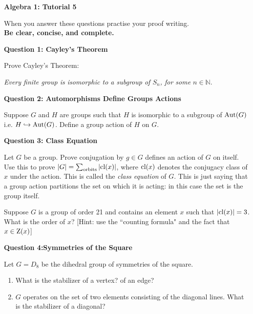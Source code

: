 \documentclass[11pt,twoside, a4paper]{report}
\theoremstyle{plain}
\theoremstyle{definition}
\newcommand{\cl}{\textnormal{cl}} %
\newcommand{\Z}{\textnormal{Z}} %
\newcommand{\injmor}{\hookrightarrow}%
\newcommand{\Aut}{\textnormal{Aut}}%
\begin{document}
\begin{center}
 \noindent\makebox[\linewidth]{\rule{14cm}{1.5pt}} 
{\bf Algebra 1: Tutorial 5 }
 \noindent\makebox[\linewidth]{\rule{14cm}{1.5pt}}  
 \noindent\makebox[\linewidth]{\rule{14cm}{3pt}}
\end{center}

\noindent When you answer these questions practise your proof writing.\\
  {\bf Be clear, concise, and complete.}
  
  
\begin{center}
{\bf Question 1: Cayley's Theorem}
\end{center}

Prove Cayley's Theorem: 

\begin{center} 
\emph{Every finite group is isomorphic to a subgroup of $S_{n}$, for some $n \in \mathbb{N}$}. 
\end{center}


\begin{center}
{\bf Question 2: Automorphisms Define Groups Actions}
\end{center}

Suppose $G$ and $H$ are groups such that $H$ is isomorphic to a subgroup of $\Aut(G)$ i.e. $H \injmor \Aut(G)$. Define a group action of $H$ on $G$. 

\begin{center}
{\bf Question 3: Class Equation}
\end{center}

Let $G$ be a group. Prove conjugation by $g \in G$ defines an action of $G$ on itself. Use this to prove $|G|=\sum_{\textnormal{orbits}}|\cl(x)|$, where $\cl(x)$ denotes the conjugacy class of $x$ under the action. This is called the \emph{class equation} of $G$. This is just saying that a group action partitions the set on which it is acting: in this case the set is the group itself. 

Suppose $G$ is a group of order 21 and contains an element $x$ such that $|\cl(x)|=3$. What is the order of $x$? [Hint: use the ``counting formula" and the fact that $x \in \Z(x)$]

\begin{center}
{\bf Question 4:Symmetries of the Square}
\end{center}

Let $G = D_8$ be the dihedral group of symmetries of the square.

\begin{enumerate}
\item What is the stabilizer of a vertex? of an edge?
\item $G$ operates on the set of two elements consisting of the diagonal lines. What is the stabilizer of a diagonal?
\end{enumerate}
\end{document}
